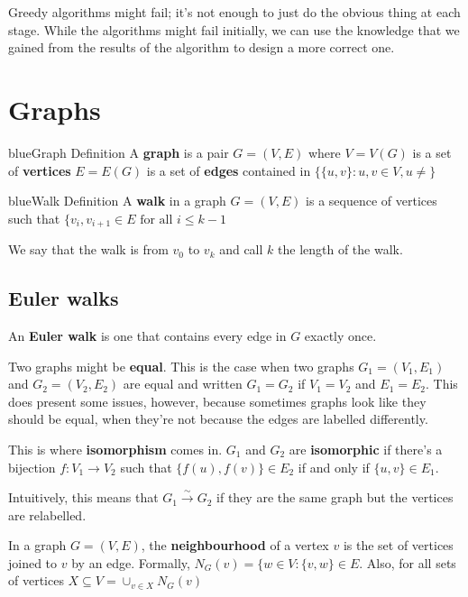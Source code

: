 \documentclass[11pt,a4paper,titlepage,dvipsnames,cmyk]{scrartcl}
\begin{document}
Greedy algorithms might fail; it's not enough to just do the obvious thing
at each stage. While the algorithms might fail initially, we can use the
knowledge that we gained from the results of the algorithm to design a
more correct one.

\section{Graphs}%
\label{sec:Graphs}

\begin{titlebox}{blue}{Graph Definition}
        A \textbf{graph} is a pair $G = (V,E)$ where $V=V(G)$ is a set of
        \textbf{vertices} $E = E(G)$ is a set of \textbf{edges} contained
        in $\{\{u,v\} : u,v \in V, u \not = \}$
\end{titlebox}

\begin{titlebox}{blue}{Walk Definition}
        A \textbf{walk} in a graph $G = (V, E)$ is a sequence of vertices
        such that $\{v_i, v_{i+1} \in E \text{ for all } i\le k-1$

        We say that the walk is from $v_0$ to $v_k$ and call $k$ the
        length of the walk.
\end{titlebox}


\subsection{Euler walks}%
\label{sub:Euler walks}
An \textbf{Euler walk} is one that contains every edge in $G$
exactly once.

Two graphs might be \textbf{equal}. This is the case when two graphs $G_1
= (V_1, E_1)$ and $G_2 = (V_2, E_2)$ are equal and written $G_1 = G_2$ if
$V_1 = V_2$ and $E_1 = E_2$. This does present some issues, however,
because sometimes graphs look like they should be equal, when they're not
because the edges are labelled differently.

This is where \textbf{isomorphism} comes in. $G_1$ and $G_2$ are
\textbf{isomorphic} if there's a bijection $f: V_1 \rightarrow V_2$ such
that $\{f(u),f(v) \} \in E_2$ if and only if $\{u,v\} \in E_1$.

Intuitively, this means that $G_1 \xrightarrow{\sim} G_2$ if they are the
same graph but the vertices are relabelled.

In a graph $G = (V,E)$, the \textbf{neighbourhood} of a vertex $v$ is the
set of vertices joined to $v$ by an edge. Formally, 
$N_G(v) = \{w \in V : \{v,w\} \in E$. Also, for all sets of vertices
$X \subseteq V = \cup_{v\in X} N_G(v)$
\end{document}
